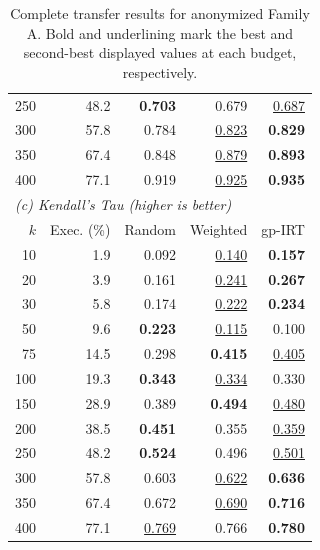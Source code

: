 \begin{table}[t]
\begin{tabular}{rrrrr}
    250 & 48.2 & \textbf{0.703} & 0.679 & \underline{0.687} \\
    300 & 57.8 & 0.784 & \underline{0.823} & \textbf{0.829} \\
    350 & 67.4 & 0.848 & \underline{0.879} & \textbf{0.893} \\
    400 & 77.1 & 0.919 & \underline{0.925} & \textbf{0.935} \\
    \midrule
    \multicolumn{5}{l}{\textit{(c) Kendall's Tau (higher is better)}} \\
    $k$ & Exec. (\%) & Random & Weighted & gp-IRT \\
    \midrule
    10 & 1.9 & 0.092 & \underline{0.140} & \textbf{0.157} \\
    20 & 3.9 & 0.161 & \underline{0.241} & \textbf{0.267} \\
    30 & 5.8 & 0.174 & \underline{0.222} & \textbf{0.234} \\
    50 & 9.6 & \textbf{0.223} & \underline{0.115} & 0.100 \\
    75 & 14.5 & 0.298 & \textbf{0.415} & \underline{0.405} \\
    100 & 19.3 & \textbf{0.343} & \underline{0.334} & 0.330 \\
    150 & 28.9 & 0.389 & \textbf{0.494} & \underline{0.480} \\
    200 & 38.5 & \textbf{0.451} & 0.355 & \underline{0.359} \\
    250 & 48.2 & \textbf{0.524} & 0.496 & \underline{0.501} \\
    300 & 57.8 & 0.603 & \underline{0.622} & \textbf{0.636} \\
    350 & 67.4 & 0.672 & \underline{0.690} & \textbf{0.716} \\
    400 & 77.1 & \underline{0.769} & 0.766 & \textbf{0.780} \\
    \bottomrule
  \end{tabular}
  \caption{Complete transfer results for anonymized Family A. Bold and underlining mark the best and second-best displayed values at each budget, respectively.}
  \label{tab:transfer-family-a-complete}
\end{table}
